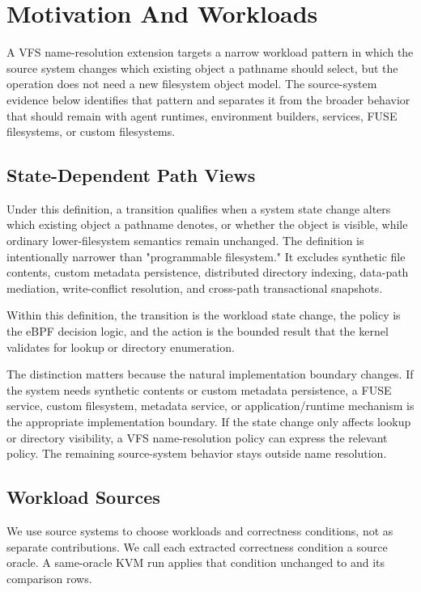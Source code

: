 \section{Motivation And Workloads}
\label{sec:workload-characterization}

A VFS name-resolution extension targets a narrow workload pattern in which the
source system changes which existing object a pathname should select, but the
operation does not need a new filesystem object model.
The source-system evidence below identifies that pattern and separates it from
the broader behavior that should remain with agent runtimes, environment
builders, services, FUSE filesystems, or custom filesystems.

\subsection{State-Dependent Path Views}

Under this definition, a transition qualifies when a system state change alters
which existing object a pathname denotes, or whether the object is visible,
while ordinary lower-filesystem semantics remain unchanged. The definition is
intentionally narrower than "programmable filesystem." It
excludes synthetic file contents, custom metadata persistence, distributed
directory indexing, data-path mediation, write-conflict resolution, and
cross-path transactional snapshots.

Within this definition, the transition is the workload state change, the policy
is the eBPF decision logic, and the action is the bounded result that the kernel
validates for lookup or directory enumeration.

The distinction matters because the natural implementation boundary changes.
If the system needs synthetic contents or custom metadata persistence, a FUSE
service, custom filesystem, metadata service, or application/runtime mechanism
is the appropriate implementation boundary. If the state change only affects
lookup or directory visibility, a VFS name-resolution policy can express the
relevant policy. The remaining source-system behavior stays outside name
resolution.

\subsection{Workload Sources}

We use source systems to choose workloads and correctness conditions, not as
separate contributions. We call each extracted correctness condition a source
oracle. A same-oracle KVM run applies that condition unchanged to \namei and its
comparison rows.

